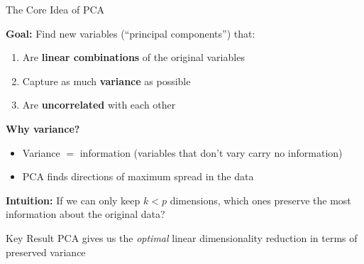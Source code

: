 \documentclass[10pt]{beamer}
\newcommand{\highlight}[1]{\textcolor{AccentOrange}{\textbf{#1}}}
\begin{document}
\begin{frame}{The Core Idea of PCA}

  \textbf{Goal:} Find new variables (``principal components'') that:
  \begin{enumerate}
    \item Are \highlight{linear combinations} of the original variables
    \item Capture as much \highlight{variance} as possible
    \item Are \highlight{uncorrelated} with each other
  \end{enumerate}

  \vspace{1em}
  \textbf{Why variance?}
  \begin{itemize}
    \item Variance $=$ information (variables that don't vary carry no information)
    \item PCA finds directions of maximum spread in the data
  \end{itemize}

  \vspace{1em}
  \textbf{Intuition:} If we can only keep $k < p$ dimensions, which ones preserve the most information about the original data?

  \vspace{0.5em}
  \begin{block}{Key Result}
    PCA gives us the \emph{optimal} linear dimensionality reduction in terms of preserved variance
  \end{block}
\end{frame}

\end{document}
